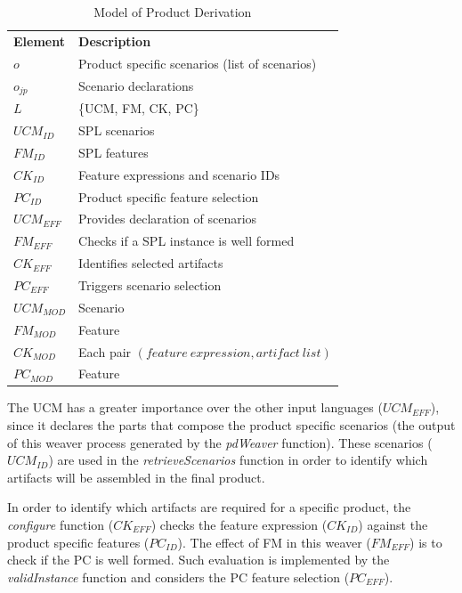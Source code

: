 \documentclass{report}
\begin{document}
\begin{frontmatter}
\begin{table}[htb]
\begin{center}
\nocaptionrule \caption{Model of Product Derivation} \label{tab:pd-weaver}
\begin{tabular}{p{0.6in}p{2.4in}}
   \hline\noalign{\smallskip}
  {\bf Element} & {\bf Description} \\
   \noalign{\smallskip}
   \hline
   \noalign{\smallskip}
   $o$               & Product specific scenarios (list of scenarios) \\ 
   $o_{jp}$        & Scenario declarations \\ 
   $L$               & \{UCM, FM, CK, PC\} \\ 
   $UCM_{ID}$ & SPL scenarios \\ 
   $FM_{ID}$    & SPL features \\ 
   $CK_{ID}$    & Feature expressions and scenario IDs\\  
   $PC_{ID}$    & Product specific feature selection \\ 
   $UCM_{EFF}$ & Provides declaration of scenarios \\  
   $FM_{EFF}$    & Checks if a SPL instance is well formed \\ 
   $CK_{EFF}$    & Identifies selected artifacts  \\ 
   $PC_{EFF}$    &Triggers scenario selection \\
   $UCM_{MOD}$ & Scenario \\  
   $FM_{MOD}$   & Feature \\ 
   $CK_{MOD}$    & Each pair $(feature\ expression, artifact\ list)$  \\ 
   $PC_{MOD}$    & Feature \\
  \hline
  \end{tabular}
\end{center}
\end{table}

The UCM has a greater importance over the other input languages ($UCM_{EFF}$), since it declares the parts that compose the product specific scenarios (the 
output of this weaver process generated by the \emph{pdWeaver} function). These scenarios ($UCM_{ID}$) are used in the \emph{retrieveScenarios} function in order to identify which artifacts will be assembled in the final product.     

In order to identify which artifacts are required for a specific product, the \emph{configure} function ($CK_{EFF}$) checks the feature expression ($CK_{ID}$) against the product specific features ($PC_{ID}$). The effect of FM in this weaver ($FM_{EFF}$) is to check if the PC is well formed. Such evaluation is implemented by the \emph{validInstance} function and considers the PC feature selection ($PC_{EFF}$). 
  


\end{frontmatter}
\end{document}
